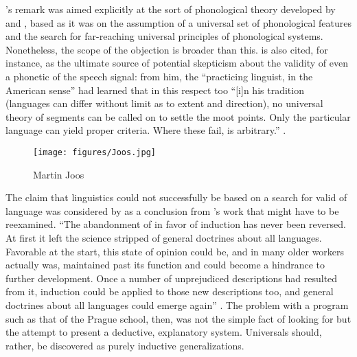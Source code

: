 {\Joos}'s remark was aimed explicitly at the sort of phonological
theory developed by {\Trubetzkoy} and {\Jakobson}, based as it was on the
assumption of a universal set of phonological features and the search
for far-reaching universal principles of phonological
systems. Nonetheless, the scope of the objection is broader than
this. {\Boas} is also cited, for instance, as the ultimate source of
potential skepticism about the validity of even a phonetic
 of the speech signal: from him, the ``practicing linguist,
in the American sense'' had learned that in this respect too ``[i]n his
{\Boas} tradition (languages can differ without limit as to extent and
direction), no universal theory of segments can be called on to settle
the moot points. Only the particular language can yield proper
criteria. Where these fail,  is arbitrary.''
\citep[228]{joos57:readings}.

\begin{wrapfigure}[11]{r}{.25\textwidth}
  \texttt{[image: figures/Joos.jpg]}
  \caption{Martin Joos}
  \label{fig:ch.structuralists.joos}
\end{wrapfigure}
The claim that linguistics could not successfully be based on a search
for valid  of language was considered by {\Joos} as a
conclusion from {\Boas}'s work that might have to be reexamined. ``The
abandonment of  in favor of induction has never been
reversed. At first it left the science stripped of general doctrines
about all languages. Favorable at the start, this state of opinion
could be, and in many older workers actually was, maintained past its
function and could become a hindrance to further development. Once a
number of unprejudiced descriptions had resulted from it, induction
could be applied to those new descriptions too, and general doctrines
about all languages could emerge again''
\citep[v]{joos57:readings}. The problem with a program such as that of
the Prague school, then, was not the simple fact of looking for
 but the attempt to present a deductive, explanatory
system. Universals should, rather, be discovered as purely inductive
generalizations.


